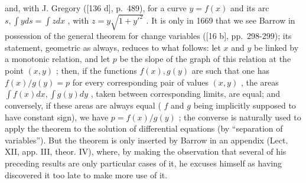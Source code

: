 and, with J. Gregory ({[}136 d{]}, p.~489), for a curve \(y = f(x)\) and its arc \(s, \int yds = \int zdx\) , with \(z = y\sqrt{1 + y'^2}\) . It is only in 1669 that we see Barrow in possession of the general theorem for change variables ({[}16 b{]}, pp.~298-299); its statement, geometric as always, reduces to what follows: let \(x\) and \(y\) be linked by a monotonic relation, and let \(p\) be the slope of the graph of this relation at the point \((x, y)\) ; then, if the functions \(f(x), g(y)\) are such that one has \(f(x)/g(y) = p\) for every corresponding pair of values \((x, y)\) , the areas \(\int f(x)dx, \int g(y)dy\) , taken between corresponding limits, are equal; and conversely, if these areas are always equal ( \(f\) and \(g\) being implicitly supposed to have constant sign), we have \(p = f(x)/g(y)\) ; the converse is naturally used to apply the theorem to the solution of differential equations (by ``separation of variables''). But the theorem is only inserted by Barrow in an appendix (Lect. XII, app. III, theor. IV), where, by making the observation that several of his preceding results are only particular cases of it, he excuses himself as having discovered it too late to make more use of it.

